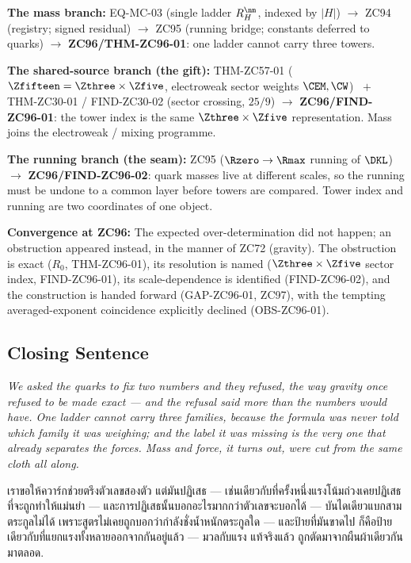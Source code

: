 \documentclass[12pt, a4paper]{article}
\begin{document}
\begin{genealogybox}[title={How ZC96 Sits in the Corpus}]
\textbf{The mass branch:}
EQ-MC-03 (single ladder $R_H^{\nm}$, indexed by $|H|$) $\to$ ZC94 (registry;
signed residual) $\to$ ZC95 (running bridge; constants deferred to quarks) $\to$
\textbf{ZC96/THM-ZC96-01}: one ladder cannot carry three towers.

\smallskip
\textbf{The shared-source branch (the gift):}
THM-ZC57-01 ($\Zfifteen=\Zthree\times\Zfive$, electroweak sector weights
$\CEM,\CW$) $\;+\;$ THM-ZC30-01 / FIND-ZC30-02 (sector crossing, $25/9$) $\to$
\textbf{ZC96/FIND-ZC96-01}: the tower index is the same $\Zthree\times\Zfive$
representation. Mass joins the electroweak / mixing programme.

\smallskip
\textbf{The running branch (the seam):}
ZC95 ($\Rzero\to\Rmax$ running of $\DKL$) $\to$ \textbf{ZC96/FIND-ZC96-02}:
quark masses live at different scales, so the running must be undone to a common
layer before towers are compared. Tower index and running are two coordinates of
one object.

\smallskip
\textbf{Convergence at ZC96:}
The expected over-determination did not happen; an obstruction appeared instead,
in the manner of ZC72 (gravity). The obstruction is exact ($R_0$, THM-ZC96-01),
its resolution is named ($\Zthree\times\Zfive$ sector index, FIND-ZC96-01), its
scale-dependence is identified (FIND-ZC96-02), and the construction is handed
forward (GAP-ZC96-01, ZC97), with the tempting averaged-exponent coincidence
explicitly declined (OBS-ZC96-01).
\end{genealogybox}

\subsection{Closing Sentence}

\bigskip
\begin{center}
\textit{%
  We asked the quarks to fix two numbers and they refused, the way gravity once
  refused to be made exact --- and the refusal said more than the numbers would
  have. One ladder cannot carry three families, because the formula was never
  told which family it was weighing; and the label it was missing is the very
  one that already separates the forces. Mass and force, it turns out, were cut
  from the same cloth all along.}

\medskip
{\thaifont
เราขอให้ควาร์กช่วยตรึงตัวเลขสองตัว แต่มันปฏิเสธ --- เช่นเดียวกับที่ครั้งหนึ่งแรงโน้มถ่วงเคยปฏิเสธที่จะถูกทำให้แม่นยำ ---
และการปฏิเสธนั้นบอกอะไรมากกว่าตัวเลขจะบอกได้ ---
บันไดเดียวแบกสามตระกูลไม่ได้ เพราะสูตรไม่เคยถูกบอกว่ากำลังชั่งน้ำหนักตระกูลใด ---
และป้ายที่มันขาดไป ก็คือป้ายเดียวกับที่แยกแรงทั้งหลายออกจากกันอยู่แล้ว ---
มวลกับแรง แท้จริงแล้ว ถูกตัดมาจากผืนผ้าเดียวกันมาตลอด.}
\end{center}
\end{document}
